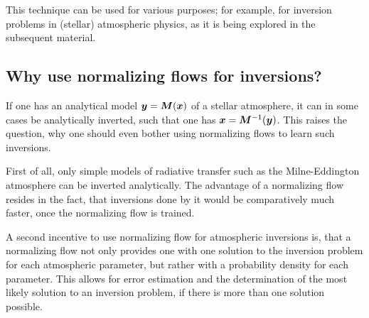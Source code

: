 \documentclass[a4paper,11pt]{report}
\def\lk#1{{\color{black}{#1}}}
\begin{document}
This technique can be used for various purposes; for example, for inversion problems in (stellar) atmospheric physics, as it is being explored in the subsequent material.

%

\subsection{Why use normalizing flows for inversions?}
If one has an analytical model $\bm{y} = \bm{M}(\bm{x})$ of a stellar atmosphere, it can in some cases be analytically inverted, such that one has $\bm{x} = \bm{M}^{-1}(\bm{y})$. This raises the question, why one should even bother using normalizing flows to learn such inversions.

First of all, only simple models of radiative transfer such as the Milne-Eddington atmosphere can be inverted analytically. \lk{More complex models require resource-demanding numerical calculations to do inversions.} The advantage of a normalizing flow resides in the fact, that inversions done by it would be comparatively much faster, once the normalizing flow is trained.

A second incentive to use normalizing flow for atmospheric inversions is, that a normalizing flow not only provides one with one solution to the inversion problem for each atmospheric parameter, but rather with a probability density for each parameter. This allows for error estimation and the determination of the most likely solution to an inversion problem, if there is more than one solution possible.
\end{document}
